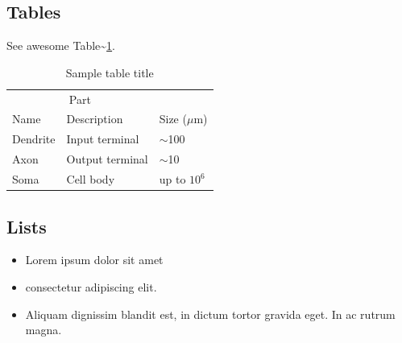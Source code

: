 \documentclass{article}
\begin{document}
\hypertarget{tables}{%
\subsection{Tables}\label{tables}}

\lipsum[12]

See awesome Table\textasciitilde{}\ref{tab:table}.

\begin{table}
 \caption{Sample table title}
  \centering
  \begin{tabular}{lll}
    \toprule
    \multicolumn{2}{c}{Part}                   \\
    \cmidrule(r){1-2}
    Name     & Description     & Size ($\mu$m) \\
    \midrule
    Dendrite & Input terminal  & $\sim$100     \\
    Axon     & Output terminal & $\sim$10      \\
    Soma     & Cell body       & up to $10^6$  \\
    \bottomrule
  \end{tabular}
  \label{tab:table}
\end{table}

\hypertarget{lists}{%
\subsection{Lists}\label{lists}}

\begin{itemize}
\tightlist
\item
  Lorem ipsum dolor sit amet
\item
  consectetur adipiscing elit.
\item
  Aliquam dignissim blandit est, in dictum tortor gravida eget. In ac
  rutrum magna.
\end{itemize}
\end{document}
